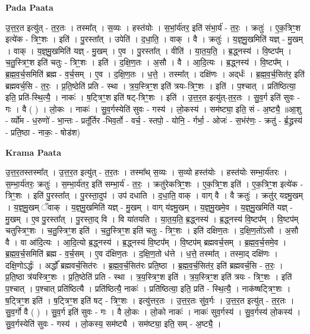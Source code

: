 \documentclass[17pt]{extarticle}
\begin{document}
\textbf{Pada Paata} \newline

उ॒त्त॒र॒त इत्यु॑त् - त॒र॒तः । तस्मा᳚त् । स॒व्यः । हस्त॑योः । स॒भां॒र्य॑तर॒ इति॑ संभा॒र्य॑ - त॒रः॒ । क्रतुः॑ । ए॒क॒त्रिꣳ॒॒श इत्ये॑क - त्रिꣳ॒॒शः । इति॑ । पु॒रस्ता᳚त् । उपेति॑ । द॒धा॒ति॒ । वाक् । वै । क्रतुः॑ । य॒ज्ञ्॒मु॒खमिति॑ यज्ञ् - मु॒खम् । वाक् । य॒ज्ञ्॒मु॒खमिति॑ यज्ञ् - मु॒खम् । ए॒व । पु॒रस्ता᳚त् । वीति॑ । या॒त॒य॒ति॒ । ब्र॒द्ध्नस्य॑ । वि॒ष्टप᳚म् । च॒तु॒स्त्रिꣳ॒॒श इति॑ चतुः - त्रिꣳ॒॒शः । इति॑ । द॒क्षि॒ण॒तः । अ॒सौ । वै । आ॒दि॒त्यः । ब्र॒द्ध्नस्य॑ । वि॒ष्टप᳚म् । ब्र॒ह्म॒व॒र्च॒समिति॑ ब्रह्म - व॒र्च॒सम् । ए॒व । द॒क्षि॒ण॒तः । ध॒त्ते॒ । तस्मा᳚त् । दक्षि॑णः । अद्‌र्धः॑ । ब्र॒ह्म॒व॒र्च॒सित॑र॒ इति॑ ब्रह्मवर्च॒सि - त॒रः॒ । प्र॒ति॒ष्ठेति॑ प्रति - स्था । त्र॒य॒स्त्रिꣳ॒॒श इति॑ त्रयः-त्रिꣳ॒॒शः । इति॑ । प॒श्चात् । प्रति॑ष्ठित्या॒ इति॒ प्रति॑-स्थि॒त्यै॒ । नाकः॑ । ष॒ट्त्रिꣳ॒॒श इति॑ षट्-त्रिꣳ॒॒शः । इति॑ । उ॒त्त॒र॒त इत्यु॑त्-त॒र॒तः । सु॒व॒र्ग इति॑ सुवः - गः । वै ( ) । लो॒कः । नाकः॑ । सु॒व॒र्गस्येति॑ सुवः - गस्य॑ । लो॒कस्य॑ । सम॑ष्ट्या॒ इति॒ सं - अ॒ष्ट्यै॒ ॥आ॒शु - र्व्यो॑म - ध॒रुणो॑ - भा॒न्तः - प्रतू᳚र्तिर -भिव॒र्तो - वर्च॒ - स्तपो॒ - योनि॒ - र्गर्भा॒ - ओजः॑ - स॒भंर॑णः॒ - क्रतु॑ - र्ब्र॒द्ध्रस्य॑ - प्रति॒ष्ठा - नाकः॒ - षोड॑श)  \newline


\textbf{Krama Paata} \newline

उ॒त्त॒र॒तस्तस्मा᳚त् । उ॒त्त॒र॒त इत्यु॑त् - त॒र॒तः । तस्मा᳚थ् स॒व्यः । स॒व्यो हस्त॑योः । हस्त॑योः सम्भा॒र्य॑तरः । स॒म्भा॒र्य॑तरः॒ क्रतुः॑ । स॒म्भा॒र्य॑तर॒ इति॑ सम्भा॒र्य॑ - त॒रः॒ । क्रतु॑रेकत्रिꣳ॒॒शः । ए॒क॒त्रिꣳ॒॒श इति॑ । ए॒क॒त्रिꣳ॒॒श इत्ये॑क - त्रिꣳ॒॒शः । इति॑ पु॒रस्ता᳚त् । पु॒रस्ता॒दुप॑ । उप॑ दधाति । द॒धा॒ति॒ वाक् । वाग् वै । वै क्रतुः॑ । क्रतु॑र् यज्ञ्मु॒खम् । य॒ज्ञ्॒मु॒खम् ॅवाक् । य॒ज्ञ्॒मु॒खमिति॑ यज्ञ् - मु॒खम् । वाग् य॑ज्ञ्मु॒खम् । य॒ज्ञ्॒मु॒खमे॒व । य॒ज्ञ्॒मु॒खमिति॑ यज्ञ् - मु॒खम् । ए॒व पु॒रस्ता᳚त् । पु॒रस्ता॒द् वि । वि या॑तयति । या॒त॒य॒ति॒ ब्र॒द्ध्नस्य॑ । ब्र॒द्ध्नस्य॑ वि॒ष्टप᳚म् । वि॒ष्टप॑म् चतुस्त्रिꣳ॒॒शः । च॒तु॒स्त्रिꣳ॒॒श इति॑ । च॒तु॒स्त्रिꣳ॒॒श इति॑ चतुः - त्रिꣳ॒॒शः । इति॑ दक्षिण॒तः । द॒क्षि॒ण॒तो॑ऽसौ । अ॒सौ वै । वा आ॑दि॒त्यः । आ॒दि॒त्यो ब्र॒द्ध्नस्य॑ । ब्र॒द्ध्नस्य॑ वि॒ष्टप᳚म् । वि॒ष्टप॑म् ब्रह्मवर्च॒सम् । ब्र॒ह्म॒व॒र्च॒समे॒व । ब्र॒ह्म॒व॒र्च॒समिति॑ ब्रह्म - व॒र्च॒सम् । ए॒व द॑क्षिण॒तः । द॒क्षि॒ण॒तो ध॑त्ते । ध॒त्ते॒ तस्मा᳚त् । तस्मा॒द् दक्षि॑णः । दक्षि॒णोऽर्द्धः॑ । अर्द्धो᳚ ब्रह्मवर्च॒सित॑रः । ब्र॒ह्म॒व॒र्च॒सित॑रः प्रति॒ष्ठा । ब्र॒ह्म॒व॒र्च॒सित॑र॒ इति॑ ब्रह्मवर्च॒सि - त॒रः॒ । प्र॒ति॒ष्ठा त्र॑यस्त्रिꣳ॒॒शः । प्र॒ति॒ष्ठेति॑ प्रति - स्था । त्र॒य॒स्त्रिꣳ॒॒श इति॑ । त्र॒य॒स्त्रिꣳ॒॒श इति॑ त्रयः - त्रिꣳ॒॒शः । इति॑ प॒श्चात् । प॒श्चात् प्रति॑ष्ठित्यै । प्रति॑ष्ठित्यै॒ नाकः॑ । प्रति॑ष्ठित्या॒ इति॒ प्रति॑ - स्थि॒त्यै॒ । नाक॑ष्षट्त्रिꣳ॒॒शः । ष॒ट्त्रिꣳ॒॒श इति॑ । ष॒ट्त्रिꣳ॒॒श इति॑ षट् - त्रिꣳ॒॒शः । इत्यु॑त्तर॒तः । उ॒त्त॒र॒तः सु॑व॒र्गः । उ॒त्त॒र॒त इत्यु॑त् - त॒र॒तः । सु॒व॒र्गो वै ( ) । सु॒व॒र्ग इति॑ सुवः - गः । वै लो॒कः । लो॒को नाकः॑ । नाकः॑ सुव॒र्गस्य॑ । सु॒व॒र्गस्य॑ लो॒कस्य॑ । सु॒व॒र्गस्येति॑ सुवः - गस्य॑ । लो॒कस्य॒ सम॑ष्ट्यै । सम॑ष्ट्या॒ इति॒ सम् - अ॒ष्ट्यै॒ । \newline
\end{document}
